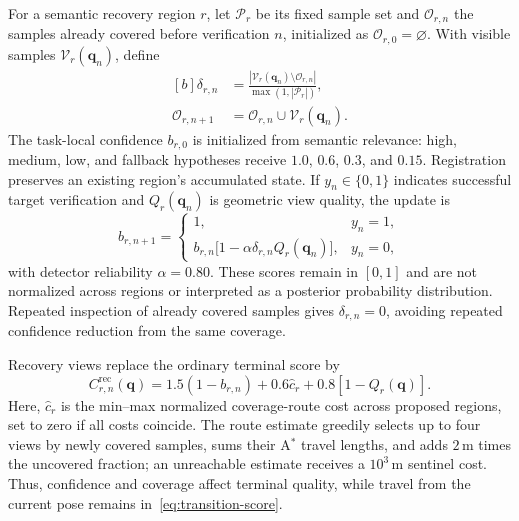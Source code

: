 \documentclass[letterpaper,10pt,journal]{IEEEtran}
\begin{document}
{ 
For a semantic recovery region $r$, let $\mathcal P_r$ be its fixed sample set and $\mathcal O_{r,n}$ the samples already covered before verification $n$, initialized as $\mathcal O_{r,0}=\varnothing$. With visible samples $\mathcal V_r(\mathbf q_n)$, define
\begin{equation}
\begin{aligned}[b]
\delta_{r,n}&=\frac{|\mathcal V_r(\mathbf q_n)\setminus\mathcal O_{r,n}|}
{\max(1,|\mathcal P_r|)},\\
\mathcal O_{r,n+1}&=\mathcal O_{r,n}\cup\mathcal V_r(\mathbf q_n).
\end{aligned}
\label{eq:recovery-coverage}
\end{equation}
}
The task-local confidence $b_{r,0}$ is initialized from semantic relevance: high, medium, low, and fallback hypotheses receive $1.0$, $0.6$, $0.3$, and $0.15$. Registration preserves an existing region's accumulated state. If $y_n\in\{0,1\}$ indicates successful target verification and $Q_r(\mathbf q_n)$ is geometric view quality, the update is
\begin{equation}
b_{r,n+1}=
\begin{cases}
1,&y_n=1,\\
b_{r,n}\bigl[1-\alpha\delta_{r,n}Q_r(\mathbf q_n)\bigr],&y_n=0,
\end{cases}
\label{eq:recovery-belief}
\end{equation}
with detector reliability $\alpha=0.80$. These scores remain in $[0,1]$ and are not normalized across regions or interpreted as a posterior probability distribution. Repeated inspection of already covered samples gives $\delta_{r,n}=0$, avoiding repeated confidence reduction from the same coverage.

Recovery views replace the ordinary terminal score by
\begin{equation}
C_{r,n}^{\mathrm{rec}}(\mathbf q)=
1.5(1-b_{r,n})+0.6\widehat c_r+0.8[1-Q_r(\mathbf q)].
\label{eq:recovery-score}
\end{equation}
Here, $\widehat c_r$ is the min--max normalized coverage-route cost across proposed regions, set to zero if all costs coincide. The route estimate greedily selects up to four views by newly covered samples, sums their A$^*$ travel lengths, and adds $2\,\mathrm m$ times the uncovered fraction; an unreachable estimate receives a $10^3\,\mathrm m$ sentinel cost. Thus, confidence and coverage affect terminal quality, while travel from the current pose remains in~\eqref{eq:transition-score}.
\end{document}
